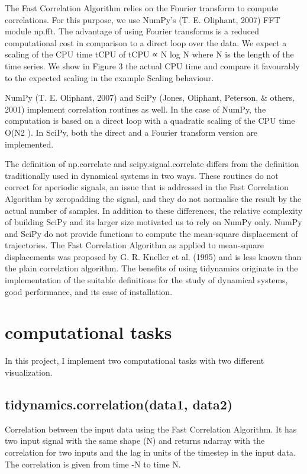 \documentclass[12pt, a4paper, twoside]{report}
\begin{document}
The Fast Correlation Algorithm relies on the Fourier transform to compute correlations.
For this purpose, we use NumPy’s (T. E. Oliphant, 2007) FFT module np.fft. The
advantage of using Fourier transforms is a reduced computational cost in comparison to a
direct loop over the data. We expect a scaling of the CPU time tCPU of tCPU ∝ N log N
where N is the length of the time series. We show in Figure 3 the actual CPU time and
compare it favourably to the expected scaling in the example Scaling behaviour.

NumPy (T. E. Oliphant, 2007) and SciPy (Jones, Oliphant, Peterson, & others, 2001)
implement correlation routines as well. In the case of NumPy, the computation is based
on a direct loop with a quadratic scaling of the CPU time O(N2
). In SciPy, both the
direct and a Fourier transform version are implemented.

The definition of np.correlate and scipy.signal.correlate differs from the definition
traditionally used in dynamical systems in two ways. These routines do not correct for
aperiodic signals, an issue that is addressed in the Fast Correlation Algorithm by zeropadding the signal, and they do not normalise the result by the actual number of samples.
In addition to these differences, the relative complexity of building SciPy and its larger
size motivated us to rely on NumPy only. NumPy and SciPy do not provide functions to
compute the mean-square displacement of trajectories. The Fast Correlation Algorithm
as applied to mean-square displacements was proposed by G. R. Kneller et al. (1995) and
is less known than the plain correlation algorithm.
The benefits of using tidynamics originate in the implementation of the suitable definitions
for the study of dynamical systems, good performance, and its ease of installation.


\newpage
\section{computational tasks}
In this project, I implement two computational tasks with two different visualization.


\subsection{tidynamics.correlation(data1, data2)}

Correlation between the input data using the Fast Correlation Algorithm. It has two  input signal with the same shape (N) and returns ndarray with the correlation for two inputs and the lag in units of the timestep in the input data. The correlation is given from time -N to time N.
\end{document}

